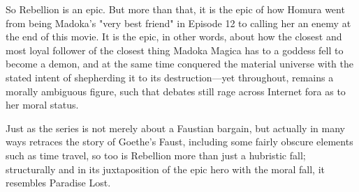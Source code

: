 So Rebellion is an epic. But more than that, it is the epic of how Homura went from being Madoka's "very best friend" in Episode 12 to calling her an enemy at the end of this movie. It is the epic, in other words, about how the closest and most loyal follower of the closest thing Madoka Magica has to a goddess fell to become a demon, and at the same time conquered the material universe with the stated intent of shepherding it to its destruction—yet throughout, remains a morally ambiguous figure, such that debates still rage across Internet fora as to her moral status.

Just as the series is not merely about a Faustian bargain, but actually in many ways retraces the story of Goethe's Faust, including some fairly obscure elements such as time travel, so too is Rebellion more than just a hubristic fall; structurally and in its juxtaposition of the epic hero with the moral fall, it resembles Paradise Lost.
